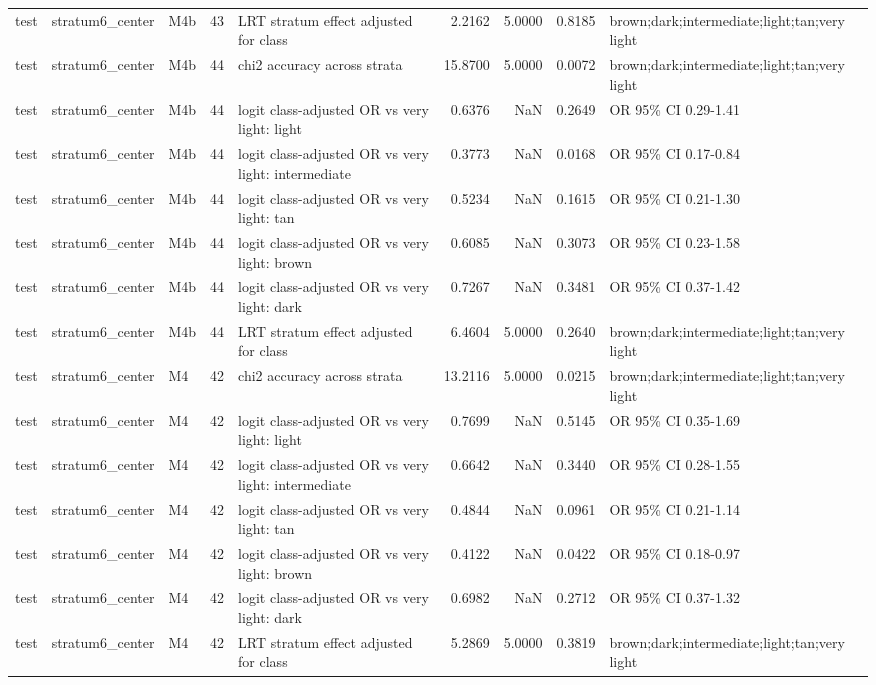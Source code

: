 \begin{tabular}{lllrlrrrl}
test & stratum6\_center & M4b & 43 & LRT stratum effect adjusted for class & 2.2162 & 5.0000 & 0.8185 & brown;dark;intermediate;light;tan;very light \\
test & stratum6\_center & M4b & 44 & chi2 accuracy across strata & 15.8700 & 5.0000 & 0.0072 & brown;dark;intermediate;light;tan;very light \\
test & stratum6\_center & M4b & 44 & logit class-adjusted OR vs very light: light & 0.6376 & NaN & 0.2649 & OR 95\% CI 0.29-1.41 \\
test & stratum6\_center & M4b & 44 & logit class-adjusted OR vs very light: intermediate & 0.3773 & NaN & 0.0168 & OR 95\% CI 0.17-0.84 \\
test & stratum6\_center & M4b & 44 & logit class-adjusted OR vs very light: tan & 0.5234 & NaN & 0.1615 & OR 95\% CI 0.21-1.30 \\
test & stratum6\_center & M4b & 44 & logit class-adjusted OR vs very light: brown & 0.6085 & NaN & 0.3073 & OR 95\% CI 0.23-1.58 \\
test & stratum6\_center & M4b & 44 & logit class-adjusted OR vs very light: dark & 0.7267 & NaN & 0.3481 & OR 95\% CI 0.37-1.42 \\
test & stratum6\_center & M4b & 44 & LRT stratum effect adjusted for class & 6.4604 & 5.0000 & 0.2640 & brown;dark;intermediate;light;tan;very light \\
test & stratum6\_center & M4 & 42 & chi2 accuracy across strata & 13.2116 & 5.0000 & 0.0215 & brown;dark;intermediate;light;tan;very light \\
test & stratum6\_center & M4 & 42 & logit class-adjusted OR vs very light: light & 0.7699 & NaN & 0.5145 & OR 95\% CI 0.35-1.69 \\
test & stratum6\_center & M4 & 42 & logit class-adjusted OR vs very light: intermediate & 0.6642 & NaN & 0.3440 & OR 95\% CI 0.28-1.55 \\
test & stratum6\_center & M4 & 42 & logit class-adjusted OR vs very light: tan & 0.4844 & NaN & 0.0961 & OR 95\% CI 0.21-1.14 \\
test & stratum6\_center & M4 & 42 & logit class-adjusted OR vs very light: brown & 0.4122 & NaN & 0.0422 & OR 95\% CI 0.18-0.97 \\
test & stratum6\_center & M4 & 42 & logit class-adjusted OR vs very light: dark & 0.6982 & NaN & 0.2712 & OR 95\% CI 0.37-1.32 \\
test & stratum6\_center & M4 & 42 & LRT stratum effect adjusted for class & 5.2869 & 5.0000 & 0.3819 & brown;dark;intermediate;light;tan;very light \\

\end{tabular}
